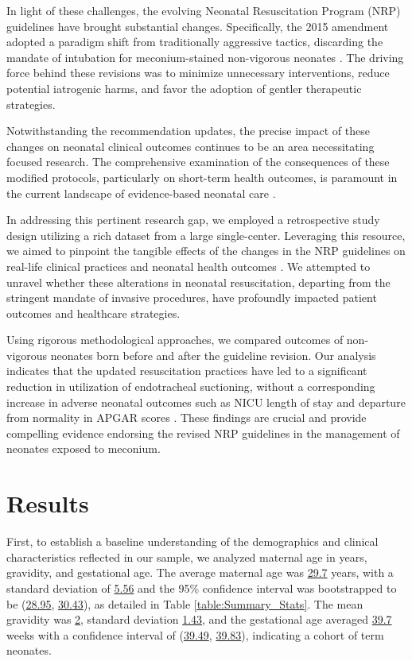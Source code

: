 \documentclass[11pt]{article}
\begin{document}
In light of these challenges, the evolving Neonatal Resuscitation Program (NRP) guidelines have brought substantial changes. Specifically, the 2015 amendment adopted a paradigm shift from traditionally aggressive tactics, discarding the mandate of intubation for meconium-stained non-vigorous neonates \cite{Aziz2020Part5N}. The driving force behind these revisions was to minimize unnecessary interventions, reduce potential iatrogenic harms, and favor the adoption of gentler therapeutic strategies. 

Notwithstanding the recommendation updates, the precise impact of these changes on neonatal clinical outcomes continues to be an area necessitating focused research. The comprehensive examination of the consequences of these modified protocols, particularly on short-term health outcomes, is paramount in the current landscape of evidence-based neonatal care \cite{Yoon2021ImpactON, Huang2017ImpactOC}.

In addressing this pertinent research gap, we employed a retrospective study design utilizing a rich dataset from a large single-center. Leveraging this resource, we aimed to pinpoint the tangible effects of the changes in the NRP guidelines on real-life clinical practices and neonatal health outcomes \cite{Kapoor2020NeonatalR, Chandrasekharan2020NeonatalRA}. We attempted to unravel whether these alterations in neonatal resuscitation, departing from the stringent mandate of invasive procedures, have profoundly impacted patient outcomes and healthcare strategies.

Using rigorous methodological approaches, we compared outcomes of non-vigorous neonates born before and after the guideline revision. Our analysis indicates that the updated resuscitation practices have led to a significant reduction in utilization of endotracheal suctioning, without a corresponding increase in adverse neonatal outcomes such as NICU length of stay and departure from normality in APGAR scores \cite{Davidson2017GuidelinesFF, Perel2006ComparisonOT}. These findings are crucial and provide compelling evidence endorsing the revised NRP guidelines in the management of neonates exposed to meconium.

\section*{Results}

First, to establish a baseline understanding of the demographics and clinical characteristics reflected in our sample, we analyzed maternal age in years, gravidity, and gestational age. The average maternal age was \hyperlink{A1a}{29.7} years, with a standard deviation of \hyperlink{A1b}{5.56} and the 95\% confidence interval was bootstrapped to be (\hyperlink{A1c}{28.95}, \hyperlink{A1d}{30.43}), as detailed in Table \ref{table:Summary_Stats}. The mean gravidity was \hyperlink{A2a}{2}, standard deviation \hyperlink{A2b}{1.43}, and the gestational age averaged \hyperlink{A3a}{39.7} weeks with a confidence interval of (\hyperlink{A3c}{39.49}, \hyperlink{A3d}{39.83}), indicating a cohort of term neonates.
\end{document}
